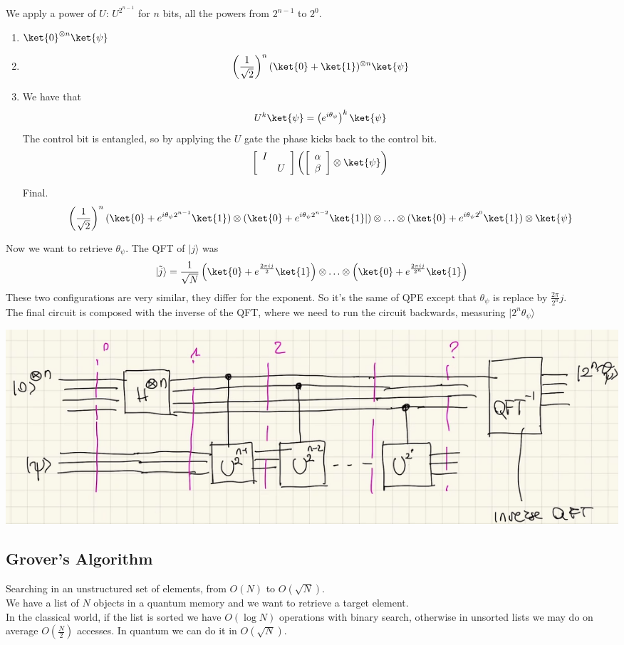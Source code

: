 \documentclass[10pt]{report}
\begin{document}
We apply a power of $U$: $U^{2^{n-1}}$ for $n$ bits, all the powers from $2^{n-1}$ to $2^0$.
\begin{enumerate}
	\item $\ket{0}^{\otimes n}\ket{\psi}$
	\item $$\left(\frac{1}{\sqrt{2}}\right)^n (\ket{0}+\ket{1})^{\otimes n}\ket{\psi}$$
	\item We have that $$U^k\ket{\psi} = \left(e^{i\theta_\psi}\right)^k\ket{\psi}$$
	The control bit is entangled, so by applying the $U$ gate the phase kicks back to the control bit.
	$$\left[\begin{array}{c c}
	I&\\
	&U
	\end{array}\right]\left(\left[\begin{array}{c}
	\alpha\\\beta
	\end{array}\right]\otimes\ket{\psi}\right)$$
	\item[Final.] $$\left(\frac{1}{\sqrt{2}}\right)^n (\ket{0}+e^{i\theta_\psi 2^{n-1}}\ket{1})\otimes(\ket{0}+e^{i\theta_\psi 2^{n-2}}\ket{1}|)\otimes\ldots\otimes(\ket{0}+e^{i\theta_\psi 2^{0}}\ket{1})\otimes\ket{\psi}$$
\end{enumerate}
Now we want to retrieve $\theta_\psi$. The QFT of $|j\rangle$ was $$|\tilde{j}\rangle = \frac{1}{\sqrt{N}}\left(\ket{0}+e^{\frac{2\pi ij}{2}}\ket{1}\right)\otimes\ldots\otimes\left(\ket{0}+e^{\frac{2\pi ij}{2^n}}\ket{1}\right)$$
These two configurations are very similar, they differ for the exponent. So it's the same of QPE except that $\theta_\psi$ is replace by $\frac{2\pi}{2^n}j$.\\
The final circuit is composed with the inverse of the QFT, where we need to run the circuit backwards, measuring $|2^n\theta_\psi\rangle$
\begin{center}
	\includegraphics[scale=0.5]{29.png}
\end{center}
\subsection{Grover's Algorithm} 
Searching in an unstructured set of elements, from $O(N)$ to $O(\sqrt{N})$.\\We have a list of $N$ objects in a quantum memory and we want to retrieve a target element.\\
In the classical world, if the list is sorted we have $O(\log N)$ operations with binary search, otherwise in unsorted lists we may do on average $O(\frac{N}{2})$ accesses. In quantum we can do it in $O(\sqrt{N})$.
\end{document}
